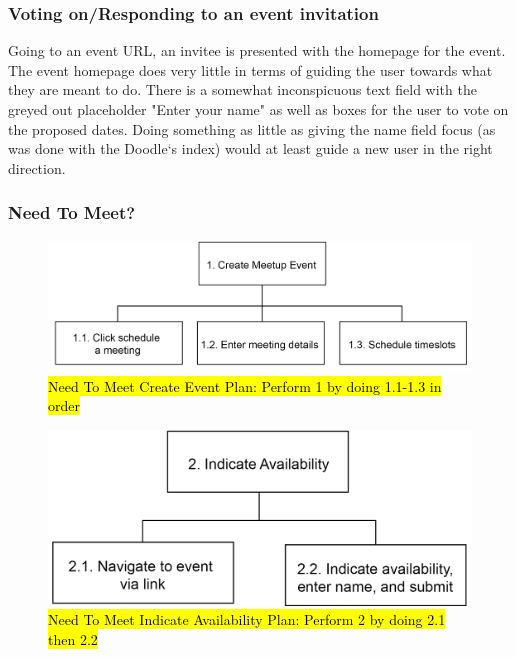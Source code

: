 \documentclass{sigchi}
\begin{document}
\subsubsection{Voting on/Responding to an event invitation}

Going to an event URL, an invitee is presented with the homepage for
the event. The event homepage does very little in terms of guiding
the user towards what they are meant to do. There is a somewhat
inconspicuous text field with the greyed out placeholder "Enter your
name" as well as boxes for the user to vote on the proposed
dates. Doing something as little as giving the name field focus (as
was done with the Doodle`s index) would at least guide a new user in
the right direction.
\FloatBarrier
\subsubsection{Need To Meet?}
\FloatBarrier
\begin{figure}
  \centering
  \includegraphics[width=1.75\columnwidth]{figures/NeedToMeet/HTA_host}
  \caption{\hl{Need To Meet Create Event Plan: Perform 1 by doing 1.1-1.3 in order}}
\end{figure}

\begin{figure}
  \centering
  \includegraphics[width=1.75\columnwidth]{figures/NeedToMeet/HTA_attend}
  \caption{\hl{Need To Meet Indicate Availability Plan: Perform 2 by doing 2.1 then 2.2}}
\end{figure}
\end{document}

